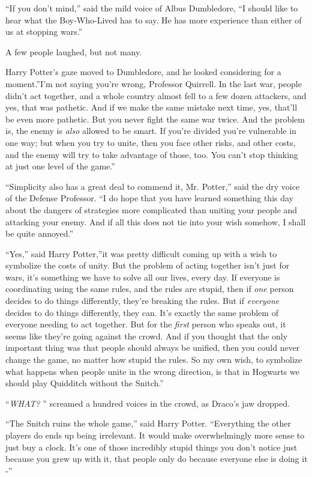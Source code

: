 ``If you don't mind,'' said the mild voice of Albus Dumbledore, ``I
should like to hear what the Boy-Who-Lived has to say. He has more
experience than either of us at stopping wars.''

A few people laughed, but not many.

Harry Potter's gaze moved to Dumbledore, and he looked considering for a
moment.''I'm not saying you're wrong, Professor Quirrell. In the last
war, people didn't act together, and a whole country almost fell to a
few dozen attackers, and yes, that was pathetic. And if we make the same
mistake next time, yes, that'll be even more pathetic. But you never
fight the same war twice. And the problem is, the enemy is \emph{also}
allowed to be smart. If you're divided you're vulnerable in one way; but
when you try to unite, then you face other risks, and other costs, and
the enemy will try to take advantage of those, too. You can't stop
thinking at just one level of the game.''

``Simplicity also has a great deal to commend it, Mr. Potter,'' said the
dry voice of the Defense Professor. ``I do hope that you have learned
something this day about the dangers of strategies more complicated than
uniting your people and attacking your enemy. And if all this does not
tie into your wish somehow, I shall be quite annoyed.''

``Yes,'' said Harry Potter,''it was pretty difficult coming up with a
wish to symbolize the costs of unity. But the problem of acting together
isn't just for wars, it's something we have to solve all our lives,
every day. If everyone is coordinating using the same rules, and the
rules are stupid, then if \emph{one} person decides to do things
differently, they're breaking the rules. But if \emph{everyone} decides
to do things differently, they can. It's exactly the same problem of
everyone needing to act together. But for the \emph{first} person who
speaks out, it seems like they're going against the crowd. And if you
thought that the only important thing was that people should always be
unified, then you could never change the game, no matter how stupid the
rules. So my own wish, to symbolize what happens when people unite in
the wrong direction, is that in Hogwarts we should play Quidditch
without the Snitch.''

``\emph{WHAT?} '' screamed a hundred voices in the crowd, as Draco's jaw
dropped.

``The Snitch ruins the whole game,'' said Harry Potter. ``Everything the
other players do ends up being irrelevant. It would make overwhelmingly
more sense to just buy a clock. It's one of those incredibly stupid
things you don't notice just because you grew up with it, that people
only do because everyone else is doing it -''

